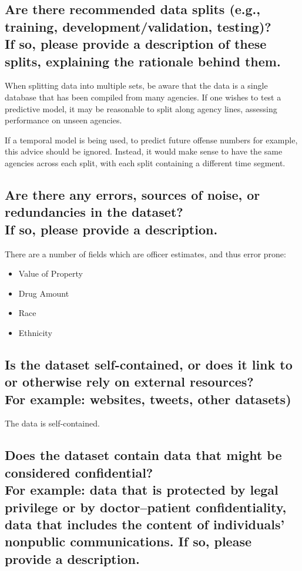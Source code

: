 \documentclass[letterpaper, 10 pt, conference]{ieeeconf}  %
\newcommand{\subtitle}[1]{{\\ \small \normalfont \color{purple} #1}}
\begin{document}
\subsection{Are there recommended data splits (e.g., training, development/validation, testing)? \subtitle{If so, please provide a description of these splits, explaining the rationale behind them.}}

When splitting data into multiple sets, be aware that the data is a single database that has been compiled from many agencies. If one wishes to test a predictive model, it may be reasonable to split along agency lines, assessing performance on unseen agencies. 

If a temporal model is being used, to predict future offense numbers for example, this advice should be ignored. Instead, it would make sense to have the same agencies across each split, with each split containing a different time segment. 

\subsection{Are there any errors, sources of noise, or redundancies in the dataset? \subtitle{If so, please provide a description.}}

There are a number of fields which are officer estimates, and thus error prone:

\begin{itemize}
    \item Value of Property
    \item Drug Amount
    \item Race
    \item Ethnicity
    
\end{itemize}

\subsection{Is the dataset self-contained, or does it link to or otherwise rely on external resources? \subtitle{For example: websites, tweets, other datasets)}}

The data is self-contained.

\subsection{Does the dataset contain data that might be considered confidential? \subtitle{For example: data that is protected by legal privilege or by doctor–patient confidentiality, data that includes the content of individuals’ nonpublic communications. If so, please provide a description.}}
\end{document}
